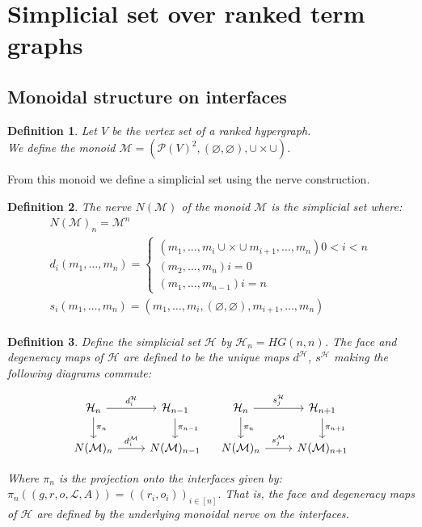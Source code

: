 \documentclass[12pt]{article}
\newtheorem{definition}{Definition}[section]
\renewcommand{\P}{\mathcal{P}}
\newcommand{\1}{\mathbbm{1}}
\renewcommand{\L}{\mathcal{L}}
\newcommand{\M}{\mathcal{M}}
\renewcommand{\H}{\mathcal{H}}
\begin{document}
\section{Simplicial set over ranked term graphs}
\subsection{Monoidal structure on interfaces}
\begin{definition}
    Let $V$ be the vertex set of a ranked hypergraph.\\
    We define the monoid $\M = (\P(V)^2, (\varnothing, \varnothing), \cup\times\cup)$. 
\end{definition}

From this monoid we define a simplicial set using the nerve construction.

\begin{definition}
    The \emph{nerve} $N(\M)$ of the monoid $\M$ is the simplicial set where:
    \begin{align*}
        N(\M)_n = \M^n\\
        d_i(m_1,\dots,m_n) = 
        \begin{cases}
            (m_1,\dots,m_i \cup\times\cup m_{i+1}, \dots, m_n)  0 < i < n\\
            (m_2,\dots, m_n)  i = 0\\
            (m_1,\dots,m_{n-1})  i = n
        \end{cases}\\
        s_i(m_1,\dots,m_n) = (m_1, \dots, m_i, (\varnothing, \varnothing), m_{i+1}, \dots, m_n)\\
    \end{align*}
\end{definition}

\begin{definition}
Define the simplicial set $\H$ by $\H_n = HG(n,n)$. The face and degeneracy maps of $\H$ are defined to be the unique maps $d^{\H}$, $s^{\H}$ making the following diagrams commute:

\[
\begin{tikzcd}
\H_n \arrow{r}{d_i^{\H}} \arrow{d}{\pi_n} & \H_{n-1} \arrow{d}{\pi_{n-1}} \\
N(\M)_n \arrow{r}{d_i^\M} & N(\M)_{n-1}
\end{tikzcd}
\quad
\begin{tikzcd}
\H_n \arrow{r}{s_j^{\H}} \arrow{d}{\pi_n} & \H_{n+1} \arrow{d}{\pi_{n+1}} \\
N(\M)_n \arrow{r}{s_j^\M} & N(\M)_{n+1}
\end{tikzcd}
\]

Where $\pi_n$ is the projection onto the interfaces given by: $\pi_n((g, r, o, \L, A)) = ((r_i, o_i))_{i\in [n]}$. That is, the face and degeneracy maps of $\H$ are defined by the underlying monoidal nerve on the interfaces.
\end{definition}
\end{document}

